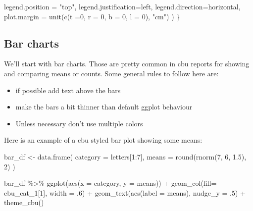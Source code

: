 \documentclass[
  letterpaper,
  DIV=11,
  numbers=noendperiod]{scrreprt}
\newenvironment{Shaded}{\begin{snugshade}}{\end{snugshade}}
\newcommand{\AttributeTok}[1]{\textcolor[rgb]{0.40,0.45,0.13}{#1}}
\newcommand{\DecValTok}[1]{\textcolor[rgb]{0.68,0.00,0.00}{#1}}
\newcommand{\FloatTok}[1]{\textcolor[rgb]{0.68,0.00,0.00}{#1}}
\newcommand{\FunctionTok}[1]{\textcolor[rgb]{0.28,0.35,0.67}{#1}}
\newcommand{\NormalTok}[1]{\textcolor[rgb]{0.00,0.23,0.31}{#1}}
\newcommand{\OtherTok}[1]{\textcolor[rgb]{0.00,0.23,0.31}{#1}}
\newcommand{\SpecialCharTok}[1]{\textcolor[rgb]{0.37,0.37,0.37}{#1}}
\newcommand{\StringTok}[1]{\textcolor[rgb]{0.13,0.47,0.30}{#1}}
\begin{document}
\begin{Shaded}
\begin{Highlighting}[]
          \AttributeTok{legend.position =} \StringTok{"top"}\NormalTok{,}
          \AttributeTok{legend.justification=}\StringTok{\textquotesingle{}left\textquotesingle{}}\NormalTok{,}
          \AttributeTok{legend.direction=}\StringTok{\textquotesingle{}horizontal\textquotesingle{}}\NormalTok{,}
          \AttributeTok{plot.margin =} \FunctionTok{unit}\NormalTok{(}\FunctionTok{c}\NormalTok{(}\AttributeTok{t =}\DecValTok{0}\NormalTok{, }\AttributeTok{r =} \DecValTok{0}\NormalTok{, }\AttributeTok{b =} \DecValTok{0}\NormalTok{, }\AttributeTok{l =} \DecValTok{0}\NormalTok{), }\StringTok{"cm"}\NormalTok{)}
\NormalTok{          )}
\NormalTok{\}}
\end{Highlighting}
\end{Shaded}

\subsection{Bar charts}\label{bar-charts}

We'll start with bar charts. Those are pretty common in cbu reports for
showing and comparing means or counts. Some general rules to follow here
are:

\begin{itemize}
\item
  if possible add text above the bars
\item
  make the bars a bit thinner than default ggplot behaviour
\item
  Unless necessary don't use multiple colors
\end{itemize}

Here is an example of a cbu styled bar plot showing some means:

\begin{Shaded}
\begin{Highlighting}[]
\NormalTok{bar\_df }\OtherTok{\textless{}{-}} \FunctionTok{data.frame}\NormalTok{(}
    \AttributeTok{category =}\NormalTok{ letters[}\DecValTok{1}\SpecialCharTok{:}\DecValTok{7}\NormalTok{],}
    \AttributeTok{means =} \FunctionTok{round}\NormalTok{(}\FunctionTok{rnorm}\NormalTok{(}\DecValTok{7}\NormalTok{, }\DecValTok{6}\NormalTok{, }\FloatTok{1.5}\NormalTok{), }\DecValTok{2}\NormalTok{)}
\NormalTok{)}

\NormalTok{bar\_df }\SpecialCharTok{\%\textgreater{}\%}
\FunctionTok{ggplot}\NormalTok{(}\FunctionTok{aes}\NormalTok{(}\AttributeTok{x =}\NormalTok{ category, }\AttributeTok{y =}\NormalTok{ means)) }\SpecialCharTok{+}
\FunctionTok{geom\_col}\NormalTok{(}\AttributeTok{fill=}\NormalTok{ cbu\_cat\_1[}\DecValTok{1}\NormalTok{], }\AttributeTok{width =}\NormalTok{ .}\DecValTok{6}\NormalTok{) }\SpecialCharTok{+}
\FunctionTok{geom\_text}\NormalTok{(}\FunctionTok{aes}\NormalTok{(}\AttributeTok{label =}\NormalTok{ means), }\AttributeTok{nudge\_y =}\NormalTok{ .}\DecValTok{5}\NormalTok{) }\SpecialCharTok{+}
\FunctionTok{theme\_cbu}\NormalTok{()}
\end{Highlighting}
\end{Shaded}
\end{document}
